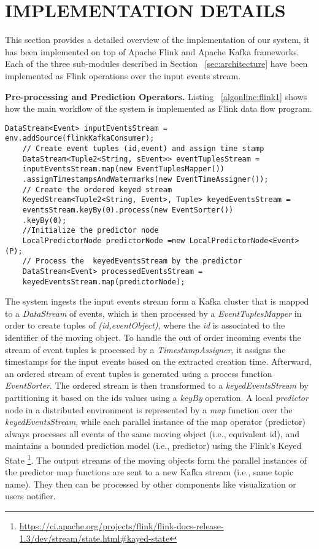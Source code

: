 

\section{IMPLEMENTATION DETAILS}
\label{sec:impl}
This section provides a detailed overview of the  implementation of our system, it has been implemented on top of Apache Flink and Apache Kafka frameworks. Each of the three sub-modules described in Section ~\ref{sec:architecture} have been implemented as Flink operations over the input events stream. 

\textbf{Pre-processing and Prediction Operators.} Listing ~\ref{algonline:flink1} shows how the main workflow of the system is implemented as Flink data flow program.


	\begin{lstlisting}[caption={Flink pipeline for local predictors workflow},label={algonline:flink1},frame=single]
	DataStream<Event> inputEventsStream = env.addSource(flinkKafkaConsumer);	
	// Create event tuples (id,event) and assign time stamp 
	DataStream<Tuple2<String, sEvent>> eventTuplesStream =
	inputEventsStream.map(new EventTuplesMapper())
	.assignTimestampsAndWatermarks(new EventTimeAssigner());	
	// Create the ordered keyed stream 
	KeyedStream<Tuple2<String, Event>, Tuple> keyedEventsStream =
	eventsStream.keyBy(0).process(new EventSorter())
	.keyBy(0);	
	//Initialize the predictor node 
	LocalPredictorNode predictorNode =new LocalPredictorNode<Event>(P);
	// Process the  keyedEventsStream by the predictor 
	DataStream<Event> processedEventsStream =
	keyedEventsStream.map(predictorNode);
	\end{lstlisting}
	
The system ingests the input events stream form a Kafka cluster that is mapped to a \textit{DataStream} of events, which is then processed by a \textit{EventTuplesMapper} in order to create tuples of \textit{(id,eventObject)}, where the \textit{id} is associated to the identifier of the moving object. To handle the out of order incoming events the stream of event tuples  is processed by a \textit{TimestampAssigner}, it assigns the timestamps for the input events based on the extracted creation time. Afterward,  an ordered stream of event tuples is generated using a process function \textit{EventSorter}. The ordered stream is then transformed to a \textit{keyedEventsStream} by partitioning it based on the ids values using a \textit{keyBy} operation. A local \textit{predictor} node in a distributed environment is represented by a \textit{map} function over the \textit{keyedEventsStream}, while each parallel instance of the map operator (predictor) always processes all events of the same moving object (i.e., equivalent id), and maintains a bounded prediction model (i.e., \pmcmr predictor) using the Flink's Keyed State  \footnote{\url{https://ci.apache.org/projects/flink/flink-docs-release-1.3/dev/stream/state.html\#kayed-state}}.  The output streams of the moving objects form the parallel instances of the predictor map functions are sent to a new Kafka stream (i.e., same topic name).  They then can be processed by other components like visualization or users notifier.


